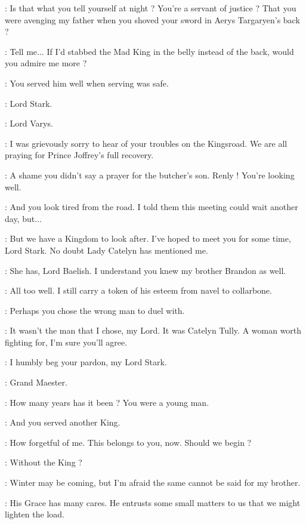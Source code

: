 \NED: Is that what you tell yourself at night ? You're a servant of justice ? That you were avenging my father when you shoved your sword in Aerys Targaryen's back ? 

\JAIME: Tell me$\ldots$ If I'd stabbed the Mad King in the belly instead of the back, would you admire me more ? 

\NED: You served him well when serving was safe. 


\VARYS: Lord Stark. 

\NED: Lord Varys. 

\VARYS: I was grievously sorry to hear of your troubles on the Kingsroad. We are all praying for Prince Joffrey's full recovery. 

\NED: A shame you didn't say a prayer for the butcher's son. Renly ! You're looking well. 

\RENLY: And you look tired from the road. I told them this meeting could wait another day, but$\ldots$ 

\LITTLEFINGER: But we have a Kingdom to look after. I've hoped to meet you for some time, Lord Stark. No doubt Lady Catelyn has mentioned me. 

\NED: She has, Lord Baelish. I understand you knew my brother Brandon as well. 

\LITTLEFINGER: All too well. I still carry a token of his esteem from navel to collarbone. 

\NED: Perhaps you chose the wrong man to duel with. 

\LITTLEFINGER: It wasn't the man that I chose, my Lord. It was Catelyn Tully. A woman worth fighting for, I'm sure you'll agree. 

\PYCELLE: I humbly beg your pardon, my Lord Stark. 

\NED: Grand Maester. 

\PYCELLE: How many years has it been ? You were a young man. 

\NED: And you served another King. 

\PYCELLE: How forgetful of me. This belongs to you, now. Should we begin ? 

\NED: Without the King ? 

\RENLY: Winter may be coming, but I'm afraid the same cannot be said for my brother. 

\VARYS: His Grace has many cares. He entrusts some small matters to us that we might lighten the load. 

